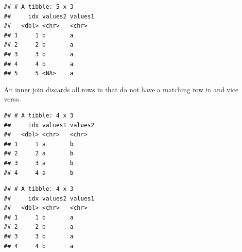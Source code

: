 \documentclass[krantz2]{krantz}\usepackage{knitr}%
\begin{document}
\begin{knitrout}\footnotesize
{}\color{fgcolor}\begin{kframe}
\begin{alltt}
\hlstd{(}   
\end{alltt}


{\ttfamily\noindent\itshape{}}\begin{verbatim}
## # A tibble: 5 x 3
##     idx values2 values1
##   <dbl> <chr>   <chr>  
## 1     1 b       a      
## 2     2 b       a      
## 3     3 b       a      
## 4     4 b       a      
## 5     5 <NA>    a
\end{verbatim}
\end{kframe}
\end{knitrout}

An inner join discards all rows in  that do not have a matching row in  and vice versa.

\begin{knitrout}\footnotesize
{}\color{fgcolor}\begin{kframe}
\begin{alltt}
\hlstd{(}   
\end{alltt}


{\ttfamily\noindent\itshape{}}\begin{verbatim}
## # A tibble: 4 x 3
##     idx values1 values2
##   <dbl> <chr>   <chr>  
## 1     1 a       b      
## 2     2 a       b      
## 3     3 a       b      
## 4     4 a       b
\end{verbatim}
\end{kframe}
\end{knitrout}

\begin{knitrout}\footnotesize
{}\color{fgcolor}\begin{kframe}
\begin{alltt}
\hlstd{(}   
\end{alltt}


{\ttfamily\noindent\itshape{}}\begin{verbatim}
## # A tibble: 4 x 3
##     idx values2 values1
##   <dbl> <chr>   <chr>  
## 1     1 b       a      
## 2     2 b       a      
## 3     3 b       a      
## 4     4 b       a
\end{verbatim}
\end{kframe}
\end{knitrout}
\end{document}
